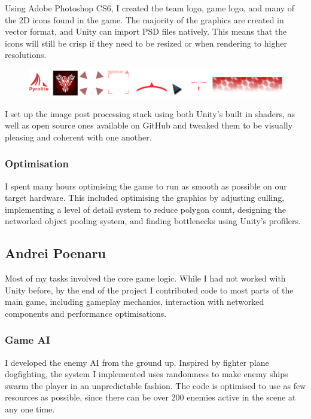 \documentclass[a4paper,11pt]{article}
\begin{document}
Using Adobe Photoshop CS6, I created the team logo, game logo, and many of the 2D icons found in the game. The majority of the graphics are created in vector format, and Unity can import PSD files natively. This means that the icons will still be crisp if they need to be resized or when rendering to higher resolutions.

\begin{figure}[ht]
	\centering
	\includegraphics[width=\textwidth]{images/2dArt}
\end{figure}

I set up the image post processing stack using both Unity’s built in shaders, as well as open source ones available on GitHub and tweaked them to be visually pleasing and coherent with one another.

\subsubsection{Optimisation}
I spent many hours optimising the game to run as smooth as possible on our target hardware. This included optimising the graphics by adjusting culling, implementing a level of detail system to reduce polygon count, designing the networked object pooling system, and finding bottlenecks using Unity’s profilers.

\clearpage

\subsection{Andrei Poenaru}

Most of my tasks involved the core game logic. While I had not worked with Unity before, by the end of the project I contributed code to most parts of the main game, including gameplay mechanics, interaction with networked components and performance optimisations.

\subsubsection{Game AI}

I developed the enemy AI from the ground up. Inspired by fighter plane dogfighting, the system I implemented uses randomness to make enemy ships swarm the player in an unpredictable fashion. The code is optimised to use as few resources as possible, since there can be over 200 enemies active in the scene at any one time.
\end{document}

